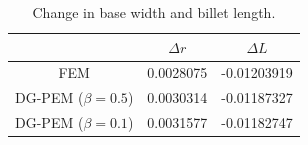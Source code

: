 \begin{table}[!ht]
  \begin{center}
    \begin{tabular}{| c || c | c |}
    \hline
                           & $\Delta r$ & $\Delta L$  \\ \hline \hline
    FEM                    & 0.0028075  & -0.01203919 \\ \hline
    DG-PEM ($\beta = 0.5$) & 0.0030314  & -0.01187327 \\ \hline
    DG-PEM ($\beta = 0.1$) & 0.0031577  & -0.01182747 \\
    \hline
    \end{tabular}
    \caption{Change in base width and billet length.}
    \vspace{-5pt}
    \label{tab:change_in_length_measurements}
    \vspace{-25pt}
  \end{center}
\end{table}
